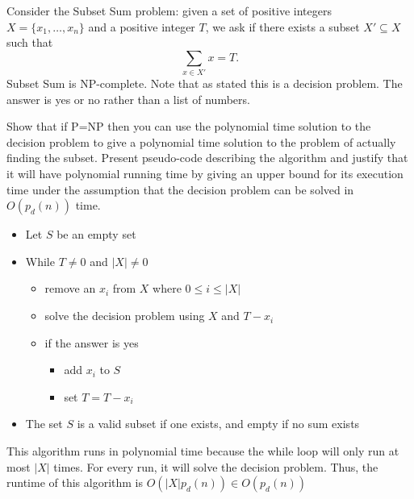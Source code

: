
Consider the {\sc Subset Sum} problem:  given a set of positive integers $X=\{x_{1}, \ldots, x_{n}\}$ and a positive integer $T$, we ask if there exists a subset $X' \subseteq X$ such that \[\sum_{x \in X'} x = T.\]  {\sc Subset Sum} is NP-complete.  Note that as stated this is a decision problem. The answer is yes or no rather than a list of numbers.

Show that if P=NP then you can use the polynomial time solution to the decision problem to give a polynomial time solution to the problem of actually finding the subset. Present pseudo-code describing the algorithm and
justify that it will have polynomial running time by giving an upper bound for its execution time under
the assumption that the decision problem can be solved in $O(p_d(n))$ time.

\begin{solution}

\begin{itemize}
	\item Let $S$ be an empty set
	\item While $T \ne 0$ and $|X| \ne 0$
	\begin{itemize}
		\item remove an $x_i$ from $X$ where $0\le i \le |X|$
		\item solve the decision problem using $X$ and $T-x_i$
		\item if the answer is yes
		\begin{itemize}
			\item add $x_i$ to $S$
			\item set $T = T - x_i$ 
		\end{itemize}
	\end{itemize}
	\item The set $S$ is a valid subset if one exists, and empty if no sum exists
\end{itemize}
This algorithm runs in polynomial time because the while loop will only run at most $|X|$ times. For every run, it will solve the decision problem. Thus, the runtime of this algorithm is $O(|X|p_d(n)) \in O(p_d(n))$
\end{solution}

